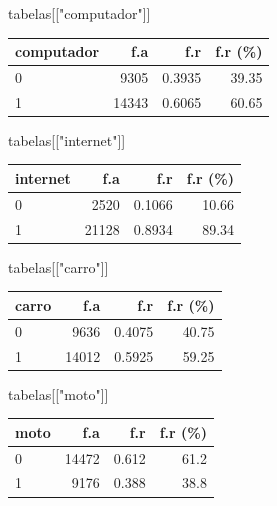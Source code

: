 \documentclass[
]{article}
\newenvironment{Shaded}{\begin{snugshade}}{\end{snugshade}}
\newcommand{\NormalTok}[1]{\textcolor[rgb]{0.00,0.23,0.31}{#1}}
\newcommand{\StringTok}[1]{\textcolor[rgb]{0.13,0.47,0.30}{#1}}
\begin{document}
\begin{Shaded}
\begin{Highlighting}[]
\NormalTok{tabelas[[}\StringTok{"computador"}\NormalTok{]]}
\end{Highlighting}
\end{Shaded}

\begin{longtable}[]{@{}lrrr@{}}
\toprule()
computador & f.a & f.r & f.r (\%) \\
\midrule()
\endhead
0 & 9305 & 0.3935 & 39.35 \\
1 & 14343 & 0.6065 & 60.65 \\
\bottomrule()
\end{longtable}

\begin{Shaded}
\begin{Highlighting}[]
\NormalTok{tabelas[[}\StringTok{"internet"}\NormalTok{]]}
\end{Highlighting}
\end{Shaded}

\begin{longtable}[]{@{}lrrr@{}}
\toprule()
internet & f.a & f.r & f.r (\%) \\
\midrule()
\endhead
0 & 2520 & 0.1066 & 10.66 \\
1 & 21128 & 0.8934 & 89.34 \\
\bottomrule()
\end{longtable}

\begin{Shaded}
\begin{Highlighting}[]
\NormalTok{tabelas[[}\StringTok{"carro"}\NormalTok{]]}
\end{Highlighting}
\end{Shaded}

\begin{longtable}[]{@{}lrrr@{}}
\toprule()
carro & f.a & f.r & f.r (\%) \\
\midrule()
\endhead
0 & 9636 & 0.4075 & 40.75 \\
1 & 14012 & 0.5925 & 59.25 \\
\bottomrule()
\end{longtable}

\begin{Shaded}
\begin{Highlighting}[]
\NormalTok{tabelas[[}\StringTok{"moto"}\NormalTok{]]}
\end{Highlighting}
\end{Shaded}

\begin{longtable}[]{@{}lrrr@{}}
\toprule()
moto & f.a & f.r & f.r (\%) \\
\midrule()
\endhead
0 & 14472 & 0.612 & 61.2 \\
1 & 9176 & 0.388 & 38.8 \\
\bottomrule()
\end{longtable}
\end{document}
